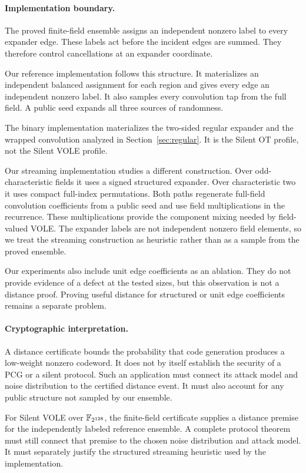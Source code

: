 \paragraph{Implementation boundary.}
The proved finite-field ensemble assigns an independent nonzero label to every
expander edge.  These labels act before the incident edges are summed.  They
therefore control cancellations at an expander coordinate.

Our reference implementation follows this structure.  It materializes an
independent balanced assignment for each region and gives every edge an
independent nonzero label.  It also samples every convolution tap from the
full field.  A public seed expands all three sources of randomness.

The binary implementation materializes the two-sided regular expander and
the wrapped convolution analyzed in Section~\ref{sec:regular}.  It is the
Silent OT profile, not the Silent VOLE profile.

Our streaming implementation studies a different construction.  Over
odd-characteristic fields it uses a signed structured expander.  Over
characteristic two it uses compact full-index permutations.  Both paths
regenerate full-field convolution coefficients from a public seed and use
field multiplications in the recurrence.  These multiplications provide the
component mixing needed by field-valued VOLE.  The expander labels are not
independent nonzero field elements, so we treat the streaming construction as
heuristic rather than as a sample from the proved ensemble.

Our experiments also include unit edge coefficients as an ablation.  They do
not provide evidence of a defect at the tested sizes, but this observation is
not a distance proof.  Proving useful distance for structured or unit edge
coefficients remains a separate problem.

\paragraph{Cryptographic interpretation.}
A distance certificate bounds the probability that code generation produces
a low-weight nonzero codeword.  It does not by itself establish the security
of a PCG or a silent protocol.  Such an application must connect its attack
model and noise distribution to the certified distance event.  It must also
account for any public structure not sampled by our ensemble.

For Silent VOLE over $\mathbb F_{2^{128}}$, the finite-field certificate supplies a
distance premise for the independently labeled reference ensemble.  A
complete protocol theorem must still connect that premise to the chosen noise
distribution and attack model.  It must separately justify the structured
streaming heuristic used by the implementation.

